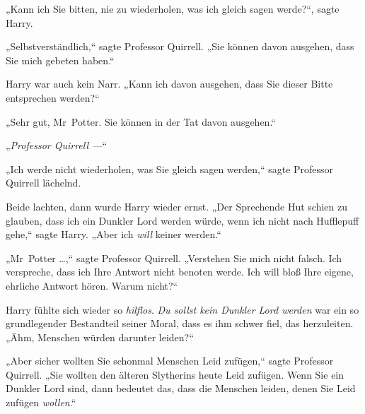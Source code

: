 „Kann ich Sie bitten, nie zu wiederholen, was ich gleich sagen werde?“, sagte Harry.

„Selbstverständlich,“ sagte Professor Quirrell. „Sie können davon ausgehen, dass Sie mich gebeten haben.“

Harry war auch kein Narr. „Kann ich davon ausgehen, dass Sie dieser Bitte entsprechen werden?“

„Sehr gut, Mr~Potter. Sie können in der Tat davon ausgehen.“

„\emph{Professor Quirrell —}“

„Ich werde nicht wiederholen, was Sie gleich sagen werden,“ sagte Professor Quirrell lächelnd.

Beide lachten, dann wurde Harry wieder ernst. „Der Sprechende Hut schien zu glauben, dass ich ein Dunkler Lord werden würde, wenn ich nicht nach Hufflepuff gehe,“ sagte Harry. „Aber ich \emph{will} keiner werden.“

„Mr~Potter …,“ sagte Professor Quirrell. „Verstehen Sie mich nicht falsch. Ich verspreche, dass ich Ihre Antwort nicht benoten werde. Ich will bloß Ihre eigene, ehrliche Antwort hören. Warum nicht?“

Harry fühlte sich wieder so \emph{hilflos}. \emph{Du sollst kein Dunkler Lord werden} war ein so grundlegender Bestandteil seiner Moral, dass es ihm schwer fiel, das herzuleiten. „Ähm, Menschen würden darunter leiden?“

„Aber sicher wollten Sie schonmal Menschen Leid zufügen,“ sagte Professor Quirrell. „Sie wollten den älteren Slytherins heute Leid zufügen. Wenn Sie ein Dunkler Lord sind, dann bedeutet das, dass die Menschen leiden, denen Sie Leid zufügen \emph{wollen}.“

